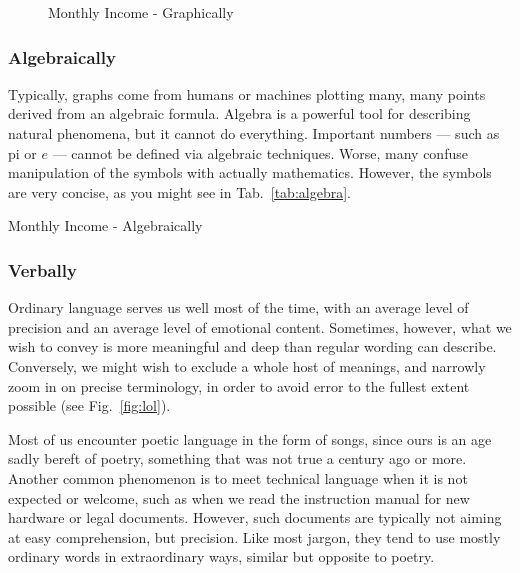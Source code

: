 \begin{figure}[h]
\centering
{}
\caption[Graph]{Monthly Income  - Graphically\label{fig:graphically}}
\end{figure}


\subsubsection{Algebraically}
Typically, graphs come from humans or machines plotting many, 
many points derived from an \gls{algebraic} formula.
Algebra is a powerful tool for describing natural phenomena, 
but it cannot do everything.  Important numbers
--- such as \gls{pi} or $e$ --- cannot be defined via algebraic techniques.  
Worse, many confuse manipulation of the symbols with actually mathematics.
However, the symbols are very concise, as you might see in Tab.~\ref{tab:algebra}.

{Monthly Income - Algebraically\label{tab:algebra}}



\subsubsection{Verbally}
Ordinary language serves us well most of the time, with an average level of 
precision and an average level of
emotional content.  Sometimes, however, what we wish to convey is more 
meaningful and deep than
regular wording can describe.  Conversely, we might wish to exclude a whole 
host of meanings, and narrowly
zoom in on precise terminology, in order to avoid error to the fullest extent possible
(see Fig.~\ref{fig:lol}).


Most of us encounter poetic language in the form of songs, since ours is an 
age sadly bereft of
poetry, something that was not true a century ago or more.  Another common 
phenomenon is to meet 
technical language when it is not expected or welcome, such as when we read the 
instruction manual for new
hardware or legal documents.  However, such documents are typically not aiming at 
easy comprehension, but
precision.  Like most jargon, they tend to use mostly ordinary words in extraordinary 
ways, similar but opposite
to poetry.

